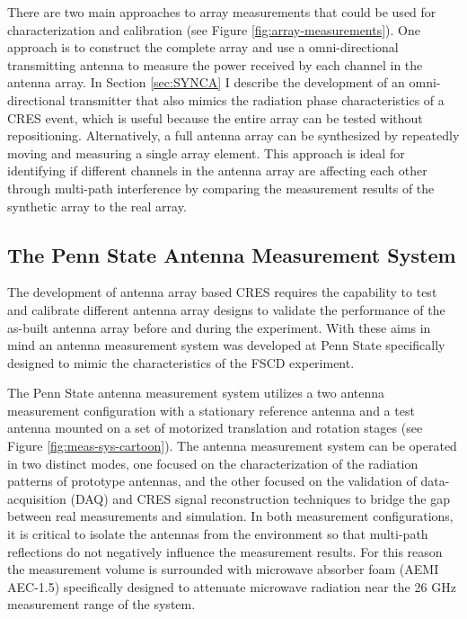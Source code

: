 There are two main approaches to array measurements that could be used for characterization and calibration (see Figure \ref{fig:array-measurements}). One approach is to construct the complete array and use a omni-directional transmitting antenna to measure the power received by each channel in the antenna array. In Section \ref{sec:SYNCA} I describe the development of an omni-directional transmitter that also mimics the radiation phase characteristics of a CRES event, which is useful because the entire array can be tested without repositioning. Alternatively, a full antenna array can be synthesized by repeatedly moving and measuring a single array element. This approach is ideal for identifying if different channels in the antenna array are affecting each other through multi-path interference by comparing the measurement results of the synthetic array to the real array. 

\subsection{The Penn State Antenna Measurement System}
\label{sec:antenna_measurement_system}

The development of antenna array based CRES requires the capability to test and calibrate different antenna array designs to validate the performance of the as-built antenna array before and during the experiment. With these aims in mind an antenna measurement system was developed at Penn State specifically designed to mimic the characteristics of the FSCD experiment.

The Penn State antenna measurement system utilizes a two antenna measurement configuration with a stationary reference antenna and a test antenna mounted on a set of motorized translation and rotation stages (see Figure \ref{fig:meas-sys-cartoon}). The antenna measurement system can be operated in two distinct modes, one focused on the characterization of the radiation patterns of prototype antennas, and the other focused on the validation of data-acquisition (DAQ) and CRES signal reconstruction techniques to bridge the gap between real measurements and simulation. In both measurement configurations, it is critical to isolate the antennas from the environment so that multi-path reflections do not negatively influence the measurement results. For this reason the measurement volume is surrounded with microwave absorber foam (AEMI AEC-1.5) specifically designed to attenuate microwave radiation near the 26 GHz measurement range of the system.

